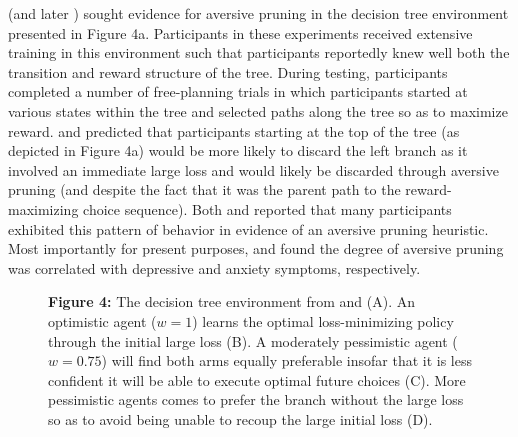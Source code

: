 \documentclass[11pt]{article} %
\begin{document}
\cite{Huys2012} (and later \cite{Lally2017}) sought evidence for aversive pruning in the decision tree environment presented in Figure 4a. Participants in these experiments received extensive training in this environment such that participants reportedly knew well both the transition and reward structure of the tree. During testing, participants completed a number of free-planning trials in which participants started at various states within the tree and selected paths along the tree so as to maximize reward. \cite{Huys2012} and \cite{Lally2017} predicted that participants starting at the top of the tree (as depicted in Figure 4a) would be more likely to discard the left branch as it involved an immediate large loss and would likely be discarded through aversive pruning (and despite the fact that it was the parent path to the reward-maximizing choice sequence). Both \cite{Huys2012} and \cite{Lally2017} reported that many participants exhibited this pattern of behavior in evidence of an aversive pruning heuristic. Most importantly for present purposes, \cite{Huys2012} and \cite{Lally2017} found the degree of aversive pruning was correlated with depressive and anxiety symptoms, respectively.

\begin{figure}
  \centerline{%
  }
  \par \textbf{Figure 4:} The decision tree environment from \cite{Huys2012} and \cite{Lally2017} (A). An optimistic agent ($w=1$) learns the optimal loss-minimizing policy through the initial large loss (B). A moderately pessimistic agent ($w=0.75$) will find both arms equally preferable insofar that it is less confident it will be able to execute optimal future choices (C). More pessimistic agents comes to prefer the branch without the large loss so as to avoid being unable to recoup the large initial loss (D).
\end{figure}
\end{document}
